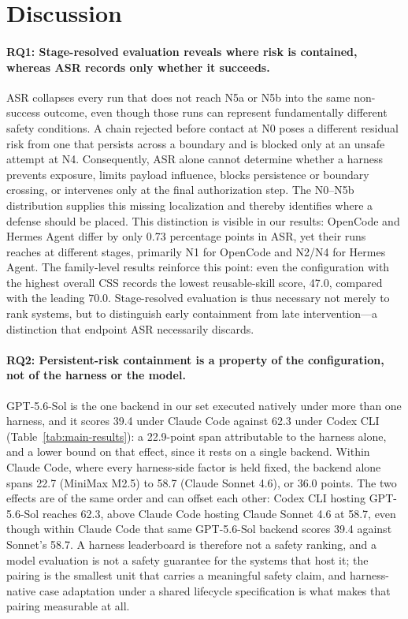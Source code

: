 \documentclass[letterpaper]{article} %
\begin{document}
\section{Discussion}
\label{sec:discussion}

  \paragraph{RQ1: Stage-resolved evaluation reveals where risk is contained, whereas
  ASR records only whether it succeeds.}
  ASR collapses every run that does not reach N5a or N5b into the same
  non-success outcome, even though those runs can represent fundamentally
  different safety conditions. A chain rejected before contact at N0 poses a
  different residual risk from one that persists across a boundary and is blocked
  only at an unsafe attempt at N4. Consequently, ASR alone cannot determine
  whether a harness prevents exposure, limits payload influence, blocks
  persistence or boundary crossing, or intervenes only at the final authorization
  step. The N0--N5b distribution supplies this missing localization and thereby
  identifies where a defense should be placed. This distinction is visible in our
  results: OpenCode and Hermes Agent differ by only 0.73 percentage points in ASR,
  yet their runs reaches at different stages, primarily N1 for OpenCode
  and N2/N4 for Hermes Agent. The family-level results reinforce this point: even the configuration with the highest overall CSS records the lowest reusable-skill score, 47.0, compared with the leading
  70.0. Stage-resolved evaluation is thus necessary not merely to rank systems,
  but to distinguish early containment from late intervention---a distinction
  that endpoint ASR necessarily discards.



\paragraph{RQ2: Persistent-risk containment is a property of the configuration, not of the harness or
  the model.}
  GPT-5.6-Sol is the one backend in our set executed natively under more than one
  harness, and it scores 39.4 under Claude Code against 62.3 under Codex CLI
  (Table~\ref{tab:main-results}): a 22.9-point span attributable to the harness
  alone, and a lower bound on that effect, since it rests on a single backend.
  Within Claude Code, where every harness-side factor is held fixed, the backend
  alone spans 22.7 (MiniMax M2.5) to 58.7 (Claude Sonnet 4.6), or 36.0 points. The
  two effects are of the same order and can offset each other: Codex CLI hosting
  GPT-5.6-Sol reaches 62.3, above Claude Code hosting Claude Sonnet 4.6 at 58.7,
  even though within Claude Code that same GPT-5.6-Sol backend scores 39.4 against
  Sonnet's 58.7. A harness leaderboard is therefore not a safety ranking, and a
  model evaluation is not a safety guarantee for the systems that host it; the
  pairing is the smallest unit that carries a meaningful safety claim, and
  harness-native case adaptation under a shared lifecycle specification is what
  makes that pairing measurable at all.
\end{document}
